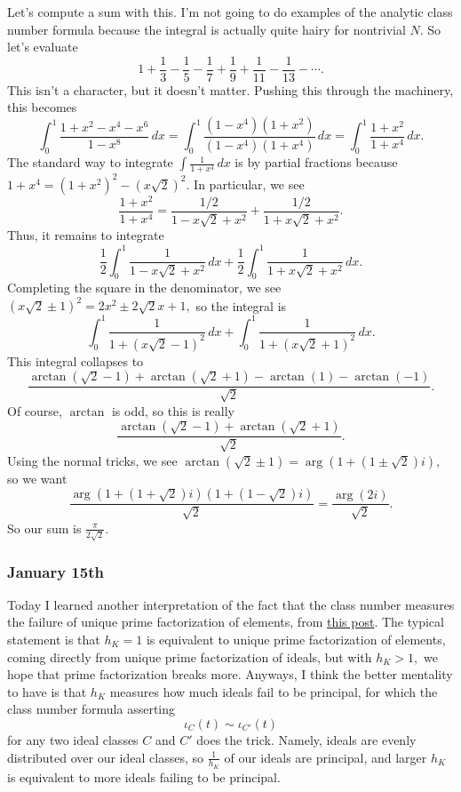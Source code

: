 Let's compute a sum with this. I'm not going to do examples of the analytic class number formula because the integral is actually quite hairy for nontrivial $N.$ So let's evaluate
\[1+\frac13-\frac15-\frac17+\frac19+\frac1{11}-\frac1{13}-\cdots.\]
This isn't a character, but it doesn't matter. Pushing this through the machinery, this becomes
\[\int_0^1\frac{1+x^2-x^4-x^6}{1-x^8}\,dx=\int_0^1\frac{\left(1-x^4\right)\left(1+x^2\right)}{\left(1-x^4\right)\left(1+x^4\right)}\,dx=\int_0^1\frac{1+x^2}{1+x^4}\,dx.\]
The standard way to integrate $\int\frac1{1+x^4}\,dx$ is by partial fractions because $1+x^4=\left(1+x^2\right)^2-\left(x\sqrt2\right)^2.$ In particular, we see
\[\frac{1+x^2}{1+x^4}=\frac{1/2}{1-x\sqrt2+x^2}+\frac{1/2}{1+x\sqrt2+x^2}.\]
Thus, it remains to integrate
\[\frac12\int_0^1\frac1{1-x\sqrt2+x^2}\,dx+\frac12\int_0^1\frac1{1+x\sqrt2+x^2}\,dx.\]
Completing the square in the denominator, we see $(x\sqrt2\pm1)^2=2x^2\pm2\sqrt2x+1,$ so the integral is
\[\int_0^1\frac1{1+(x\sqrt2-1)^2}\,dx+\int_0^1\frac1{1+(x\sqrt2+1)^2}\,dx.\]
This integral collapses to
\[\frac{\arctan(\sqrt2-1)+\arctan(\sqrt2+1)-\arctan(1)-\arctan(-1)}{\sqrt2}.\]
Of course, $\arctan$ is odd, so this is really
\[\frac{\arctan(\sqrt2-1)+\arctan(\sqrt2+1)}{\sqrt2}.\]
Using the normal tricks, we see $\arctan(\sqrt2\pm1)=\arg\left(1+(1\pm\sqrt2)i\right),$ so we want
\[\frac{\arg\left(1+(1+\sqrt2)i\right)\left(1+(1-\sqrt2)i\right)}{\sqrt2}=\frac{\arg(2i)}{\sqrt2}.\]
So our sum is $\boxed{\textstyle\frac{\pi}{2\sqrt2}}.$

\subsubsection{January 15th}
Today I learned another interpretation of the fact that the class number measures the failure of unique prime factorization of elements, from \href{https://math.stackexchange.com/questions/1673432/what-are-some-applications-of-chebotarev-density-theorem}{this post}. The typical statement is that $h_K=1$ is equivalent to unique prime factorization of elements, coming directly from unique prime factorization of ideals, but with $h_K>1,$ we hope that prime factorization breaks more. Anyways, I think the better mentality to have is that $h_K$ measures how much ideals fail to be principal, for which the class number formula asserting
\[\iota_C(t)\sim\iota_{C'}(t)\]
for any two ideal classes $C$ and $C'$ does the trick. Namely, ideals are evenly distributed over our ideal classes, so $\frac1{h_K}$ of our ideals are principal, and larger $h_K$ is equivalent to more ideals failing to be principal.

